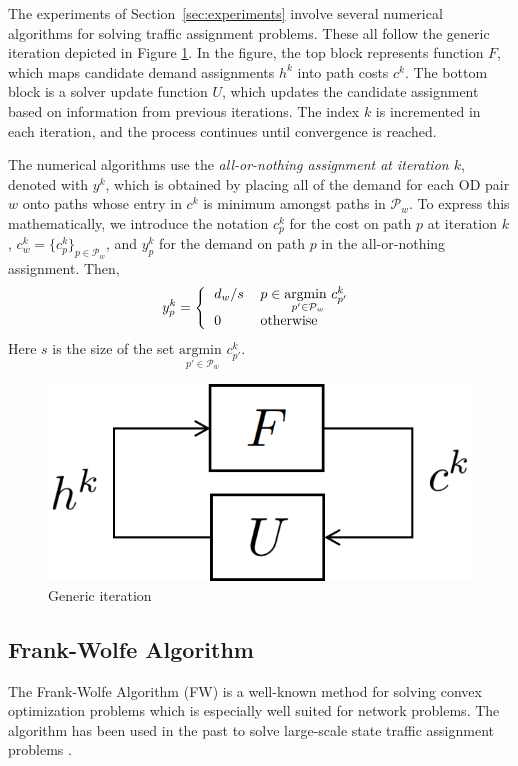 The experiments of Section~\ref{sec:experiments} involve several numerical algorithms for solving traffic assignment problems. These all follow the generic iteration depicted in Figure \ref{fig:iteartion}. In the figure, the top block represents function $F$, which maps candidate demand assignments $h^k$ into path costs $c^k$. The bottom block is a solver update function $U$, which updates the candidate assignment based on information from previous iterations. The index $k$ is incremented in each iteration, and the process continues until convergence is reached.

The numerical algorithms use the
\textit{all-or-nothing assignment at iteration $k$}, denoted with $y^k$,
which is obtained by placing all of the demand for each OD pair $w$ onto
paths whose entry in $c^k$ is minimum amongst paths in $\mathcal{P}_w$.
To express this mathematically, we introduce the notation $c^k_p$ for the
cost on path $p$ at iteration $k$, $c^k_w=\{c^k_p\}_{p\in\mathcal{P}_w}$,
and $y^k_p$ for the demand on path $p$ in the all-or-nothing assignment. Then,
\begin{equation}
\label{eq:allornothing}
y^k_p = \left\{
\begin{tabular}{ll}
$d_w/s$ & $p\in\underset{p'\in\mathcal{P}_w}{\text{argmin }} c^k_{p'} $ \\
0 & otherwise
\end{tabular}
\right.
\end{equation}
Here $s$ is the size of the set $\underset{p'\in\mathcal{P}_w}{\text{argmin }} c^k_{p'}$.

\begin{figure}[h]
    \centering
    \includegraphics[width=0.4\linewidth]{figs/iteration.png}
    \caption{Generic iteration}
    \label{fig:iteartion}
\end{figure}

\subsection{Frank-Wolfe Algorithm}

The Frank-Wolfe Algorithm (FW) 
\cite{fukushima1984modified, gartner1977analysis} 
is a well-known method for solving convex optimization problems which is especially well suited for network problems. The algorithm has been used in the past to solve large-scale state traffic assignment problems \cite{thai2016negative}.

